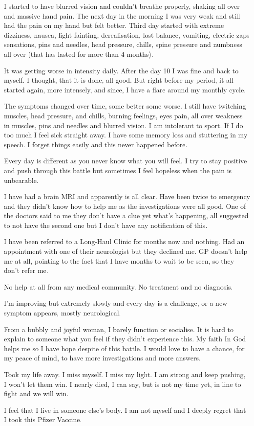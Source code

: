 I started to have blurred vision and couldn’t breathe properly, shaking all over
and massive hand pain. The next day in the morning I was very weak and still had
the pain on my hand but felt better. Third day started with extreme dizziness,
nausea, light fainting, derealisation, lost balance, vomiting, electric zaps
sensations, pins and needles, head pressure, chills, spine pressure and numbness
all over (that has lasted for more than 4 months).

It was getting worse in intensity daily. After the day 10 I was fine and back to
myself. I thought, that it is done, all good. But right before my period, it all
started again, more intensely, and since, I have a flare around my monthly
cycle.

The symptoms changed over time, some better some worse. I still have twitching
muscles, head pressure, and chills, burning feelings, eyes pain, all over
weakness in muscles, pins and needles and blurred vision. I am intolerant to
sport. If I do too much I feel sick straight away. I have some memory loss and
stuttering in my speech. I forget things easily and this never happened before.

Every day is different as you never know what you will feel. I try to stay
positive and push through this battle but sometimes I feel hopeless when the
pain is unbearable.

I have had a brain MRI and apparently is all clear. Have been twice to emergency
and they didn’t know how to help me as the investigations were all good. One of
the doctors said to me they don’t have a clue yet what’s happening, all
suggested to not have the second one but I don’t have any notification of this.

I have been referred to a Long-Haul Clinic for months now and nothing. Had an
appointment with one of their neurologist but they declined me. GP doesn’t help
me at all, pointing to the fact that I have months to wait to be seen, so they
don’t refer me.

No help at all from any medical community. No treatment and no diagnosis.

I’m improving but extremely slowly and every day is a challenge, or a new
symptom appears, mostly neurological.

From a bubbly and joyful woman, I barely function or socialise. It is hard to
explain to someone what you feel if they didn’t experience this. My faith In God
helps me so I have hope despite of this battle. I would love to have a chance,
for my peace of mind, to have more investigations and more answers.

Took my life away. I miss myself. I miss my light. I am strong and keep pushing,
I won’t let them win. I nearly died, I can say, but is not my time yet, in line
to fight and we will win.

I feel that I live in someone else’s body. I am not myself and I deeply regret
that I took this Pfizer Vaccine.
